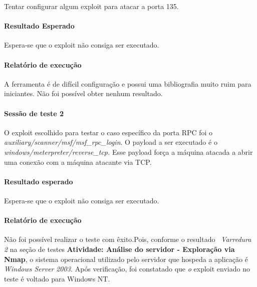 \documentclass[
    12pt,               %
    openright,          %
    oneside,            %
    a4paper,            %
    section=TITLE,     %
    english,            %
    french,             %
    spanish,            %
    brazil              %
    ]{abntex2}
\begin{document}
Tentar configurar algum exploit para atacar a porta 135.



\paragraph*{Resultado Esperado}

Espera-se que o exploit não consiga ser executado.



\paragraph*{Relatório de execução}

A ferramenta é de difícil configuração e possui uma bibliografia muito ruim para iniciantes. Não foi possível obter nenhum resultado.





\paragraph*{Sessão de teste 2}

O exploit escolhido para testar o caso específico da porta RPC foi o \emph{auxiliary/scanner/msf/msf\_rpc\_login}. O payload a ser executado é o \emph{windows/meterpreter/reverse\_tcp.} Esse payload força a máquina atacada a abrir uma conexão com a máquina atacante via TCP.~



\paragraph*{Resultado esperado}

Espera-se que o exploit não consiga ser executado.



\paragraph*{Relatório de execução}

Não foi possível realizar o teste com êxito.Pois, conforme o resultado ~\emph{Varredura 2} na seção de testes \textbf{Atividade: Análise do servidor - Exploração via Nmap}, o sistema operacional utilizado pelo servidor que hospeda a aplicação é \emph{Windows Server} \emph{2003. }Após verificação, foi constatado que\emph{ o} exploit enviado no teste é voltado para Windows NT.
\end{document}
